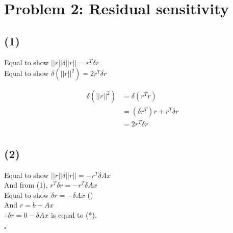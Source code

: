 \documentclass[a4paper, 11pt]{article}
\begin{document}
\section*{Problem 2: Residual sensitivity}

\subsection*{(1)}
Equal to show  $||r|| \delta ||r|| = r^T \delta r $ \\
Equal to show $\delta (||r||^2) = 2 r^T \delta r $ 

\begin{align*}
    \delta (||r||^2) &= \delta (r^T r) \\
    &= (\delta r^T) r + r^T \delta r \\
    &= 2 r^T \delta r \\
\end{align*}

\subsection*{(2)}

Equal to show $||r|| \delta ||r|| = - r^T \delta A x $ \\
And from (1), $r^T \delta r = - r^T \delta A x $ \\
Equal to show $ \delta r = - \delta A x $ ()\\
And $r = b - A x$ \\
$\therefore \delta r = 0 - \delta A x $ is equal to (*).

$\square$
\end{document}
